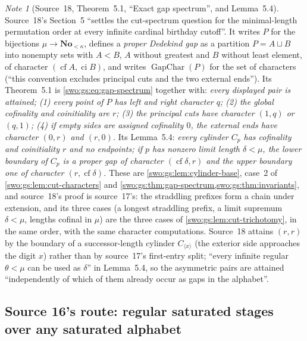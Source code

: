 \documentclass[11pt]{article}
\theoremstyle{definition}
\theoremstyle{remark}
\newtheorem{note}[note]{Note}
\newcommand{\No}{\mathbf{No}}
\newcommand{\cf}{\operatorname{cf}}
\newcommand{\ci}{\operatorname{ci}}
\newcommand{\GapChar}{\operatorname{GapChar}}
\begin{document}
\begin{note}[Source~18, Theorem~5.1, ``Exact gap spectrum'', and Lemma~5.4]\label{swo:sh:thm:exact-gap-spectrum}\label{swo:sh:lem:gap-cylinders}\label{swo:sh:sec:exact-gap-spectrum}
Source~18's Section~5 ``settles the cut-spectrum question for the
minimal-length permutation order at every infinite cardinal birthday cutoff''.
It writes $P$ for the bijections $\mu\to\No_{<\kappa}$, defines a
\emph{proper Dedekind gap} as a partition $P=A\sqcup B$ into nonempty sets with
$A<B$, $A$ without greatest and $B$ without least element, of character
$(\cf A,\ci B)$, and writes $\GapChar(P)$ for the set of characters (``this
convention excludes principal cuts and the two external ends''). Its
Theorem~5.1 is \eqref{swo:gs:eq:gap-spectrum} together with: \emph{every
displayed pair is attained; (1) every point of $P$ has left and right
character $q$; (2) the global cofinality and coinitiality are $r$; (3) the
principal cuts have character $(1,q)$ or $(q,1)$; (4) if empty sides are
assigned cofinality $0$, the external ends have character $(0,r)$ and $(r,0)$.}
Its Lemma~5.4: \emph{every cylinder $C_p$ has cofinality and coinitiality $r$
and no endpoints; if $p$ has nonzero limit length $\delta<\mu$, the lower
boundary of $C_p$ is a proper gap of character $(\cf\delta,r)$ and the upper
boundary one of character $(r,\cf\delta)$.} These are
\cref{swo:gs:lem:cylinder-base}, case~2 of \cref{swo:gs:lem:cut-characters} and
\cref{swo:gs:thm:gap-spectrum,swo:gs:thm:invariants}, and source~18's proof is
source~17's: the straddling prefixes form a chain under extension, and its
three cases (a longest straddling prefix, a limit supremum $\delta<\mu$, lengths
cofinal in $\mu$) are the three cases of \cref{swo:gs:lem:cut-trichotomy}, in
the same order, with the same character computations. Source~18 attains
$(r,r)$ by the boundary of a successor-length cylinder
$C_{\langle x\rangle}$ (the exterior side approaches the digit $x$) rather than
by source~17's first-entry split; ``every infinite regular $\theta<\mu$ can be
used as $\delta$'' in Lemma~5.4, so the asymmetric pairs are attained
``independently of which of them already occur as gaps in the alphabet''.
\end{note}

\subsection{Source 16's route: regular saturated stages over any saturated alphabet}
\label{swo:vi:sub:ds-regular}
\end{document}
